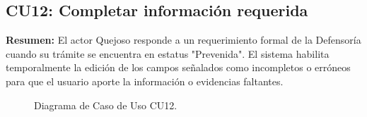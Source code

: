 \begin{appendices}
\subsection{CU12: Completar información requerida}

\textbf{Resumen:} 
El actor Quejoso responde a un requerimiento formal de la Defensoría cuando su trámite se encuentra en estatus "Prevenida". El sistema habilita temporalmente la edición de los campos señalados como incompletos o erróneos para que el usuario aporte la información o evidencias faltantes.

\begin{figure}[htbp]
    \centering
    \figCUdoce
    \caption{Diagrama de Caso de Uso CU12.}
    \label{fig:cu12}
\end{figure}


\end{appendices}
